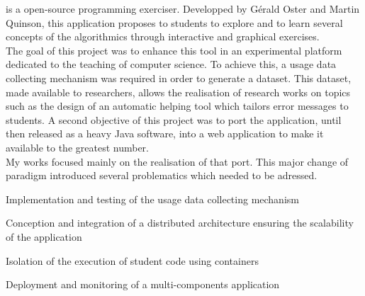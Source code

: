 \begin{minipage}{\dimexpr\textwidth-0.5cm}
\href{http://people.irisa.fr/Martin.Quinson/Teaching/PLM/}{}
is a open-source programming exerciser.
Developped by Gérald Oster and Martin Quinson, this application proposes to students
to explore and to learn several concepts of the algorithmics through interactive and graphical exercises.
\\
The goal of this project was to enhance this tool in an experimental platform dedicated
to the teaching of computer science.
To achieve this, a usage data collecting mechanism was required in order to generate a dataset.
This dataset, made available to researchers, allows the realisation of research works on topics
such as the design of an automatic helping tool which tailors error messages to students.
A second objective of this project was to port the application, until then released as
a heavy Java software, into a web application to make it available to the greatest number.
\\
My works focused mainly on the realisation of that port.
This major change of paradigm introduced several problematics which needed to be adressed.
\begin{tightemize}
    \item Implementation and testing of the usage data collecting mechanism
    \item Conception and integration of a distributed architecture ensuring the scalability of the application
    \item Isolation of the execution of student code using containers
    \item Deployment and monitoring of a multi-components application
\end{tightemize}
\sectionsep\xdef\tpd{\the\prevdepth}
\end{minipage}

\sectionsep

